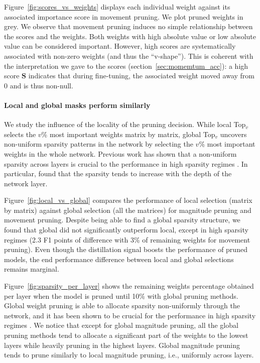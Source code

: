 \documentclass{article}
\begin{document}
Figure~\ref{fig:scores_vs_weights} displays each individual weight against its associated importance score in movement pruning. We plot pruned weights in grey. We observe that movement pruning induces no simple relationship between the scores and the weights. Both weights with high absolute value or low absolute value can be considered important. 
However, high scores are systematically associated with non-zero weights (and thus the ``v-shape''). 
This is coherent with the interpretation we gave to the scores (section~\ref{sec:momemtum_acc}): a high score $\mathbf{S}$ indicates that during fine-tuning, the associated weight moved away from 0 and is thus non-null.

\paragraph{Local and global masks perform similarly }

We study the influence of the locality of the pruning decision. While local Top$_v$ selects the $v$\% most important weights matrix by matrix, global Top$_v$ uncovers non-uniform sparsity patterns in the network by selecting the $v$\% most important weights in the whole network. Previous work has shown that a non-uniform sparsity across layers is crucial to the performance in high sparsity regimes \citep{He2018AMCAF}. In particular, \citet{Mallya2018PiggybackAM} found that the sparsity tends to increase with the depth of the network layer.

Figure~\ref{fig:local_vs_global} compares the performance of local selection (matrix by matrix) against global selection (all the matrices) for magnitude pruning and movement pruning. Despite being able to find a global sparsity structure, we found that global did not significantly outperform local, except in high sparsity regimes (2.3 F1 points of difference with 3\% of remaining weights for movement pruning). Even though the distillation signal boosts the performance of pruned models, the end performance difference between local and global selections remains marginal.


Figure~\ref{fig:sparsity_per_layer} shows the remaining weights percentage obtained per layer when the model is pruned until 10\% with global pruning methods. Global weight pruning is able to allocate sparsity non-uniformly through the network, and it has been shown to be crucial for the performance in high sparsity regimes \citep{He2018AMCAF}. We notice that except for global magnitude pruning, all the global pruning methods tend to allocate a significant part of the weights to the lowest layers while heavily pruning in the highest layers. Global magnitude pruning tends to prune similarly to local magnitude pruning, i.e., uniformly across layers.
\end{document}
